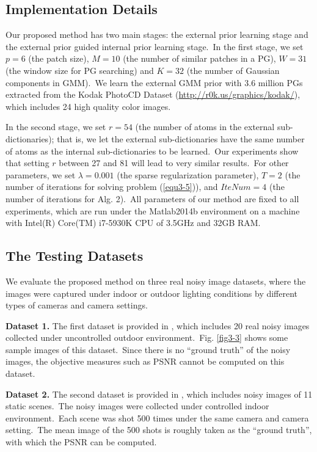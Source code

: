 \subsection{Implementation Details}

Our proposed method has two main stages: the external prior learning stage and the external prior guided internal prior learning stage.\ In the first stage, we set $p = 6$ (the patch size), $M = 10$ (the number of similar patches in a PG), $W = 31$ (the window size for PG searching) and $K = 32$ (the number of Gaussian components in GMM).\ We learn the external GMM prior with 3.6 million PGs extracted from the Kodak PhotoCD Dataset (\url{http://r0k.us/graphics/kodak/}), which includes 24 high quality color images. 

In the second stage, we set $r = 54$ (the number of atoms in the external sub-dictionaries); that is, we let the external sub-dictionaries have the same number of atoms as the internal sub-dictionaries to be learned.\ Our experiments show that setting $r$ between 27 and 81 will lead to very similar results.\ For other parameters, we set $\lambda=0.001$ (the sparse regularization parameter), $T = 2$ (the number of iterations for solving problem (\ref{equ3-5})), and $IteNum = 4$ (the number of iterations for Alg. 2).\ All parameters of our method are fixed to all experiments, which are run under the Matlab2014b environment on a machine with Intel(R) Core(TM) i7-5930K CPU of 3.5GHz and 32GB RAM.

\subsection{The Testing Datasets}

We evaluate the proposed method on three real noisy image datasets, where the images were captured under indoor or outdoor lighting conditions by different types of cameras and camera settings. 

\textbf{Dataset 1.} The first dataset is provided in \cite{ncwebsite}, which includes 20 real noisy images collected under uncontrolled outdoor environment.\ Fig. \ref{fig3-3} shows some sample images of this dataset.\ Since there is no ``ground truth'' of the noisy images, the objective measures such as PSNR cannot be computed on this dataset. 

\textbf{Dataset 2.} The second dataset is provided in \cite{crosschannel2016}, which includes noisy images of 11 static scenes.\ The noisy images were collected under controlled indoor environment.\ Each scene was shot 500 times under the same camera and camera setting.\ The mean image of the 500 shots is roughly taken as the ``ground truth'', with which the PSNR can be computed. 

